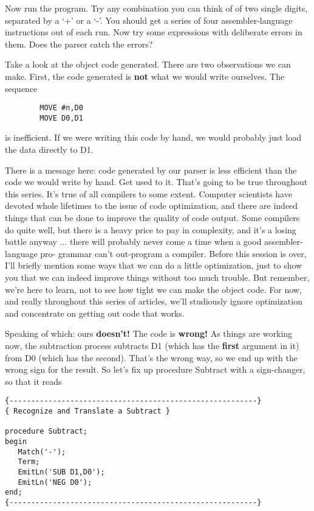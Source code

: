 Now run the program. Try any combination you can think of of two single digits, separated  by  a  `+' or a `-'. You should get a series of four assembler-language instructions out  of  each run. Now  try  some  expressions with deliberate errors in them. Does the parser catch the errors?

Take  a  look  at the object  code  generated. There  are  two observations we can make. First, the code generated is {\bfseries not} what we would write ourselves. The sequence

\begin{verbatim}
        MOVE #n,D0
        MOVE D0,D1
\end{verbatim}

is inefficient. If we were  writing  this code by hand, we would probably just load the data directly to D1.

There is a  message  here:  code  generated by our parser is less efficient  than the code we would write by hand. Get used to it. That's going to be true throughout this series. It's true of all compilers to some extent. Computer scientists have devoted whole lifetimes to the issue of code optimization, and there are indeed things that can be done to improve the quality  of  code  output. Some compilers do quite well, but  there  is a heavy price to pay in complexity, and it's  a losing  battle  anyway ... there will probably never come a time when  a  good  assembler-language pro- grammar can't out-program a compiler. Before  this  session is over, I'll briefly mention some ways that we can do a  little optimization, just  to  show you that we can indeed improve things without too much trouble. But remember, we're here to learn, not to see how tight we can make  the  object  code. For  now, and really throughout  this  series  of  articles, we'll  studiously ignore optimization and  concentrate  on  getting  out  code that works.

Speaking of which: ours {\bfseries doesn't!}  The code is {\bfseries wrong!}  As things are working  now, the subtraction process subtracts D1 (which has the {\bfseries first} argument in it) from D0 (which has the second). That's the wrong way, so we end up with the wrong  sign  for the result. So let's fix up procedure Subtract with a  sign-changer, so that it reads

\begin{verbatim}
{---------------------------------------------------------}
{ Recognize and Translate a Subtract }

procedure Subtract;
begin
   Match('-');
   Term;
   EmitLn('SUB D1,D0');
   EmitLn('NEG D0');
end;
{---------------------------------------------------------}
\end{verbatim}

